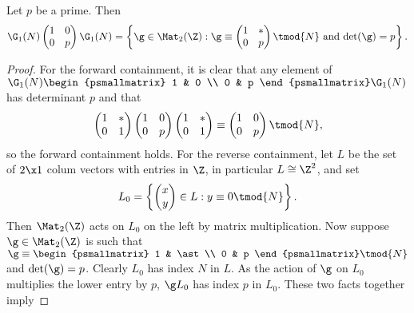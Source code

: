     \begin{lemma}\label{lem:cosets_for_Hecke_operators}
      Let $p$ be a prime. Then
      \[
        \G_{1}(N)\begin{pmatrix} 1 & 0 \\ 0 & p \end{pmatrix}\G_{1}(N) = \left\{\g \in \Mat_{2}(\Z):\text{$\g \equiv \begin{pmatrix} 1 & \ast \\ 0 & p \end{pmatrix} \tmod{N}$ and $\det(\g) = p$}\right\}.
      \]
    \end{lemma}
    \begin{proof}
      For the forward containment, it is clear that any element of $\G_{1}(N)\begin{psmallmatrix} 1 & 0 \\ 0 & p \end{psmallmatrix}\G_{1}(N)$ has determinant $p$ and that
      \[
        \begin{pmatrix} 1 & \ast \\ 0 & 1 \end{pmatrix}\begin{pmatrix} 1 & 0 \\ 0 & p \end{pmatrix}\begin{pmatrix} 1 & \ast \\ 0 & 1 \end{pmatrix} \equiv \begin{pmatrix} 1 & 0 \\ 0 & p \end{pmatrix} \tmod{N},
      \]
      so the forward containment holds. For the reverse containment, let $L$ be the set of $2 \x 1$ colum vectors with entries in $\Z$, in particular $L \cong \Z^{2}$, and set
      \[
        L_{0} = \left\{\begin{pmatrix} x \\ y \end{pmatrix} \in L: y \equiv 0 \tmod{N} \right\}.
      \]
      Then $\Mat_{2}(\Z)$ acts on $L_{0}$ on the left by matrix multiplication. Now suppose $\g \in \Mat_{2}(\Z)$ is such that $\g \equiv \begin{psmallmatrix} 1 & \ast \\ 0 & p \end{psmallmatrix} \tmod{N}$ and $\det(\g) = p$. Clearly $L_{0}$ has index $N$ in $L$. As the action of $\g$ on $L_{0}$ multiplies the lower entry by $p$, $\g L_{0}$ has index $p$ in $L_{0}$. These two facts together imply

\end{proof}
